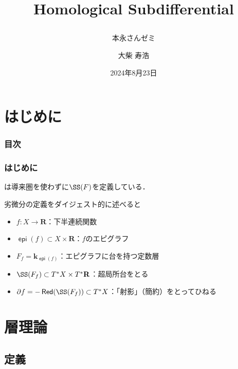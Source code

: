 \documentclass[dvipdfmx,12pt,aspectratio=169,leqno]{beamer}%
\title{Homological Subdifferential
\subtitle{本永さんゼミ}}
\date{2024年8月23日}
\author{大柴 寿浩}
\newcommand{\rr}{\mathbf{R}}
\newcommand{\kk}{\mathbf{k}}
\newcommand{\p}{\partial}
\numberwithin{equation}{subsection}
\newcommand{\Red}{\mathop{\mathsf{Red}}\nolimits}
\newcommand{\epi}{\mathop{\mathsf{epi}}\nolimits}
\theoremstyle{mystyle}
\begin{document}
\begin{frame}
    \titlepage
\end{frame}

\section*{はじめに}
\begin{frame}
    \frametitle{目次}
    \tableofcontents
\end{frame}

\begin{frame}
    \frametitle{はじめに}
    \cite{Ike24}は導来圏を使わずに\(\SS(F)\)を定義している．

    \bigskip
    劣微分の定義をダイジェスト的に述べると
    \begin{itemize}
        \item \(f\colon X\to \rr\)：下半連続関数
        \item \(\epi(f)\subset X\times \rr\)：\(f\)のエピグラフ
        \item \(F_{f}=\kk_{\epi(f)}\)：エピグラフに台を持つ定数層
        \item \(\SS(F_{f})\subset T^{\ast}X\times T^{\ast}\rr\)：超局所台をとる
        \item \(\p f = -\Red(\SS(F_{f}))\subset T^{\ast}X\)：「射影」（簡約）をとってひねる
    \end{itemize}
\end{frame}
\section[層]{層理論}
\subsection{定義}
\end{document}
